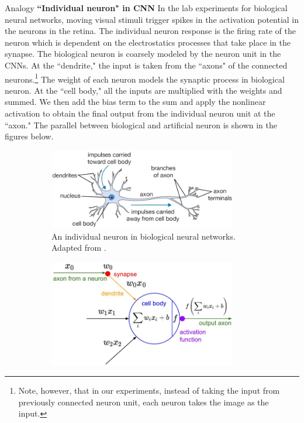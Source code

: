 \documentclass[xcolor={dvipsnames,svgnames}]{beamer}
\begin{document}
\begin{frame}[allowframebreaks]{Analogy}
 \textbf{``Individual neuron" in CNN}
 In the lab experiments for biological neural networks, moving visual stimuli trigger spikes in the activation potential in the neurons in the retina. The individual neuron response is the firing rate of the neuron which is dependent on the  electrostatics processes that take place in the synapse. The biological neuron is coarsely modeled by the neuron unit in the CNNs. At the ``dendrite," the input is taken from the ``axons" of the connected neurons.\footnote{Note, however, that in our experiments, instead of taking the input from previously connected neuron unit, each neuron takes the image as the input.} The weight of each neuron models the synaptic process in biological neuron. At the ``cell body," all the inputs are multiplied with the weights and summed. We then add the bias term to the sum and apply the nonlinear activation to obtain the final output from the individual neuron unit at the ``axon." The parallel between biological and artificial neuron is shown in the figures below. 
\begin{figure}[H]
\centering
\begin{subfigure}[b]{0.5\textwidth}
        \includegraphics[width=0.9\textwidth]{figures/artificial/neuron.png}
        \caption{An individual neuron in biological neural networks. Adapted from \cite{cs231n}.}
\end{subfigure}
\hfill
\begin{subfigure}[b]{0.45\textwidth}
        \includegraphics[width=0.9\textwidth]{figures/artificial/neuron_model.jpeg}

\end{subfigure}
\end{figure}
\end{frame}
\end{document}
